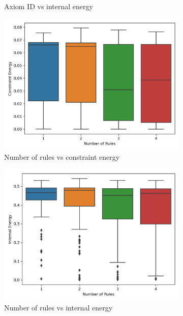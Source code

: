 \begin{figure}[H]
\begin{subfigure}[t]{0.45\textwidth}
		\caption{Axiom ID vs internal energy}
	\end{subfigure}
	\hfill
	\begin{subfigure}[t]{0.45\textwidth}
		\centering
		\includegraphics[width=\textwidth]{nor_vs_ce.png}
		\caption{Number of rules vs constraint energy}
	\end{subfigure}
	\hfill
	\begin{subfigure}[t]{0.45\textwidth}
		\centering
		\includegraphics[width=\textwidth]{nor_vs_ie.png}
		\caption{Number of rules vs internal energy}
	\end{subfigure}
	\hfill
	\begin{subfigure}[t]{0.45\textwidth}
		\centering

\end{subfigure}
\end{figure}
